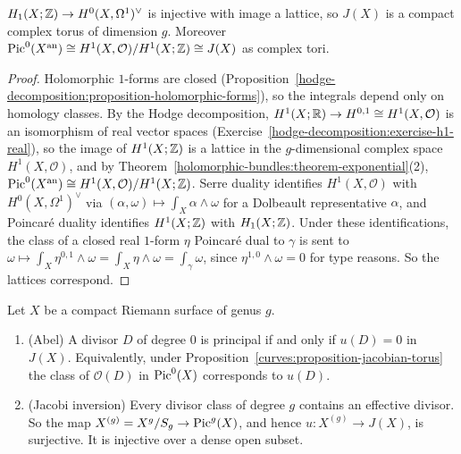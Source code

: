 \begin{proposition}\label{curves:proposition-jacobian-torus}
$H_1(X; \mathbb{Z}) \to H^0(X, \Omega^1)^\vee$ is injective with image a lattice, so $J(X)$ is a compact complex torus of dimension $g$. Moreover
$\operatorname{Pic}^0(X^{\mathrm{an}}) \cong H^1(X, \mathcal{O})/H^1(X; \mathbb{Z}) \cong J(X)$ as complex tori.
\end{proposition}

\begin{proof}
Holomorphic $1$-forms are closed (Proposition~\ref{hodge-decomposition:proposition-holomorphic-forms}), so the integrals depend only on homology classes. By the Hodge
decomposition, $H^1(X; \mathbb{R}) \to H^{0,1} \cong H^1(X, \mathcal{O})$ is an isomorphism of real vector spaces (Exercise~\ref{hodge-decomposition:exercise-h1-real}), so the image of
$H^1(X; \mathbb{Z})$ is a lattice in the $g$-dimensional complex space $H^1(X, \mathcal{O})$, and by Theorem~\ref{holomorphic-bundles:theorem-exponential}(2),
$\operatorname{Pic}^0(X^{\mathrm{an}}) \cong H^1(X, \mathcal{O})/H^1(X; \mathbb{Z})$. Serre duality identifies $H^1(X, \mathcal{O})$ with $H^0(X, \Omega^1)^\vee$ via $(\alpha, \omega) \mapsto \int_X\alpha \wedge \omega$ for a
Dolbeault representative $\alpha$, and Poincar\'e duality identifies $H^1(X; \mathbb{Z})$ with $H_1(X; \mathbb{Z})$. Under these identifications, the class of a closed real $1$-form
$\eta$ Poincar\'e dual to $\gamma$ is sent to $\omega \mapsto \int_X\eta^{0,1} \wedge \omega = \int_X\eta \wedge \omega = \int_\gamma\omega$, since $\eta^{1,0} \wedge \omega = 0$ for type
reasons. So the lattices correspond.
\end{proof}

\begin{theorem}\label{curves:theorem-abel-jacobi}
Let $X$ be a compact Riemann surface of genus $g$.
\begin{enumerate}
\item (Abel) A divisor $D$ of degree $0$ is principal if and only if $u(D) = 0$ in $J(X)$. Equivalently, under Proposition~\ref{curves:proposition-jacobian-torus} the class of
$\mathcal{O}(D)$ in $\operatorname{Pic}^0(X)$ corresponds to $u(D)$.
\item (Jacobi inversion) Every divisor class of degree $g$ contains an effective divisor. So the map $X^{(g)} = X^g/S_g \to \operatorname{Pic}^g(X)$, and hence
$u \colon X^{(g)} \to J(X)$, is surjective. It is injective over a dense open subset.
\end{enumerate}
\end{theorem}


